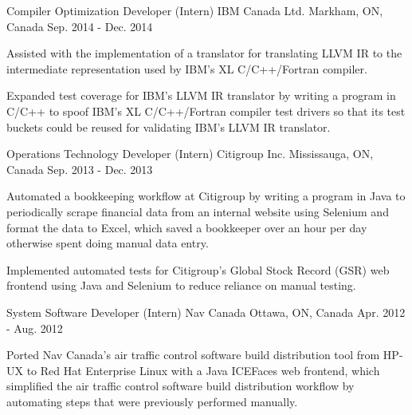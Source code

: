 \begin{cventries}
  \cventry
    {Compiler Optimization Developer (Intern)} %
    {IBM Canada Ltd.} %
    {Markham, ON, Canada} %
    {Sep. 2014 - Dec. 2014} %
    {
      \begin{cvitems} %
        \item {
          Assisted with the implementation of a translator for translating LLVM IR to
          the intermediate representation used by IBM's XL C/C++/Fortran compiler.
        }
        \item {
          Expanded test coverage for IBM's LLVM IR translator by writing a program in
          C/C++ to spoof IBM's XL C/C++/Fortran compiler test drivers so that its test
          buckets could be reused for validating IBM's LLVM IR translator.
        }
      \end{cvitems}
    }

  \cventry
    {Operations Technology Developer (Intern)} %
    {Citigroup Inc.} %
    {Mississauga, ON, Canada} %
    {Sep. 2013 - Dec. 2013} %
    {
      \begin{cvitems} %
        \item {
          Automated a bookkeeping workflow at Citigroup by writing a program in Java to
          periodically scrape financial data from an internal website using Selenium
          and format the data to Excel, which saved a bookkeeper over an hour per day
          otherwise spent doing manual data entry.
        }
        \item {
          Implemented automated tests for Citigroup's Global Stock Record
          (GSR) web frontend using Java and Selenium to reduce reliance on manual
          testing.
        }
      \end{cvitems}
    }

  \cventry
    {System Software Developer (Intern)} %
    {Nav Canada} %
    {Ottawa, ON, Canada} %
    {Apr. 2012 - Aug. 2012} %
    {
      \begin{cvitems} %
        \item {
          Ported Nav Canada's air traffic control software build distribution tool from
          HP-UX to Red Hat Enterprise Linux with a Java ICEFaces web frontend, which
          simplified the air traffic control software build distribution workflow by
          automating steps that were previously performed manually.
        }
      \end{cvitems}
    }

\end{cventries}
